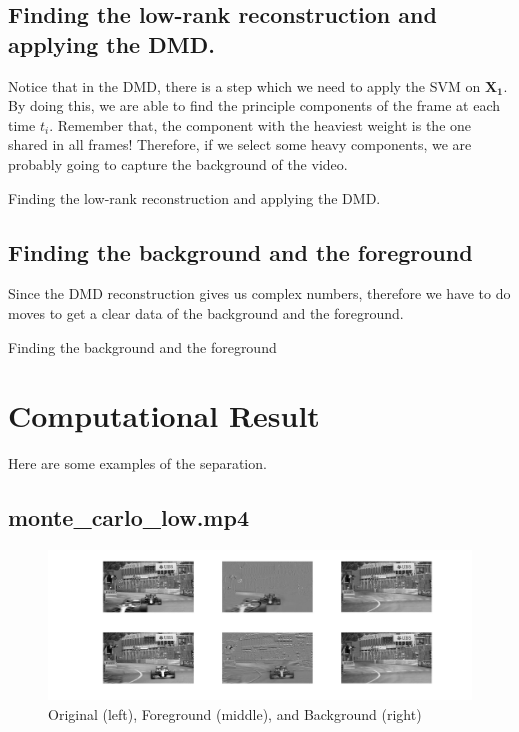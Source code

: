 \documentclass{article}
\begin{document}
\subsection{Finding the low-rank reconstruction and applying the DMD.}
Notice that in the DMD, there is a step which we need to apply the SVM on $\mathbf{X_1}$. By doing this, we are able to find the principle components of the frame at each time $t_i$. Remember that, the component with the heaviest weight is the one shared in all frames! Therefore, if we select some heavy components, we are probably going to capture the background of the video.
\newpage
\begin{algorithm}
\begin{algorithmic}
\end{algorithmic}
\caption{Finding the low-rank reconstruction and applying the DMD.}
\end{algorithm}

\subsection{Finding the background and the foreground}
Since the DMD reconstruction gives us complex numbers, therefore we have to do moves to get a clear data of the background and the foreground.
\begin{algorithm}
\begin{algorithmic}
\end{algorithmic}
\caption{Finding the background and the foreground}
\end{algorithm}

\section{Computational Result}
Here are some examples of the separation.
\subsection{monte\_carlo\_low.mp4}
\begin{figure}[h]
    \centerline{\includegraphics[width=7in]{f1.jpg}}
    \caption{Original (left), Foreground (middle), and Background (right)}
\end{figure}
\end{document}
